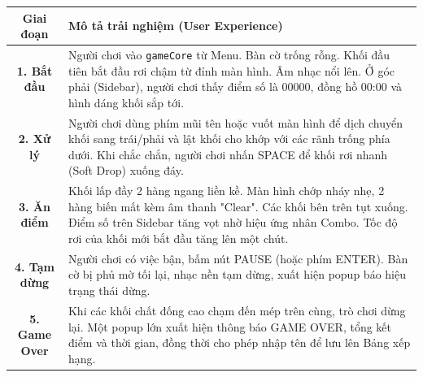 \documentclass[12pt,a4paper]{article}
\begin{document}
\vspace{5pt}
\begin{tabularx}{\linewidth}{|c|X|}
    \hline
    \textbf{Giai đoạn} & \textbf{Mô tả trải nghiệm (User Experience)} \\
    \hline
    \textbf{1. Bắt đầu} & Người chơi vào \texttt{gameCore} từ Menu. Bàn cờ trống rỗng. Khối đầu tiên bắt đầu rơi chậm từ đỉnh màn hình. Âm nhạc nổi lên. Ở góc phải (Sidebar), người chơi thấy điểm số là 00000, đồng hồ 00:00 và hình dáng khối sắp tới. \\
    \hline
    \textbf{2. Xử lý} & Người chơi dùng phím mũi tên hoặc vuốt màn hình để dịch chuyển khối sang trái/phải và lật khối cho khớp với các rãnh trống phía dưới. Khi chắc chắn, người chơi nhấn SPACE để khối rơi nhanh (Soft Drop) xuống đáy. \\
    \hline
    \textbf{3. Ăn điểm} & Khối lấp đầy 2 hàng ngang liền kề. Màn hình chớp nháy nhẹ, 2 hàng biến mất kèm âm thanh "Clear". Các khối bên trên tụt xuống. Điểm số trên Sidebar tăng vọt nhờ hiệu ứng nhân Combo. Tốc độ rơi của khối mới bắt đầu tăng lên một chút. \\
    \hline
    \textbf{4. Tạm dừng} & Người chơi có việc bận, bấm nút PAUSE (hoặc phím ENTER). Bàn cờ bị phủ mờ tối lại, nhạc nền tạm dừng, xuất hiện popup báo hiệu trạng thái dừng. \\
    \hline
    \textbf{5. Game Over} & Khi các khối chất đống cao chạm đến mép trên cùng, trò chơi dừng lại. Một popup lớn xuất hiện thông báo GAME OVER, tổng kết điểm và thời gian, đồng thời cho phép nhập tên để lưu lên Bảng xếp hạng. \\
    \hline
\end{tabularx}
\end{document}
